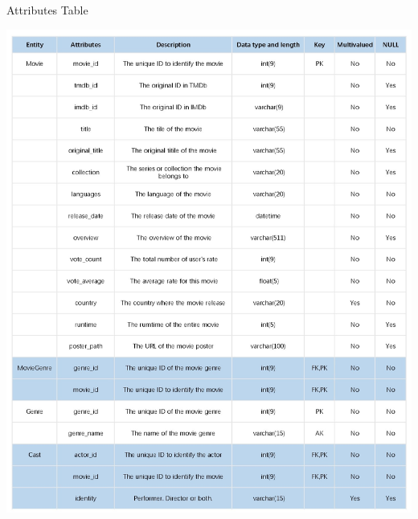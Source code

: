 \documentclass[12pt]{article}
\begin{document}
\begin{table}[H]
\centering
\renewcommand\arraystretch{1.08}
\caption{Attributes Table}
\includegraphics[width=1\linewidth]{a1.jpg}
\end{table}
\end{document}
